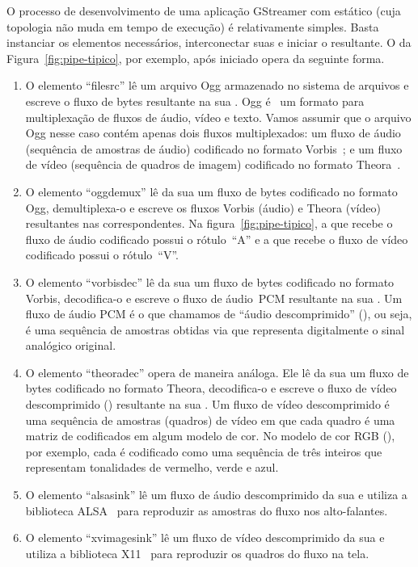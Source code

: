 \documentclass{SBCbookchapter}
\begin{document}
O processo de desenvolvimento de uma aplicação GStreamer com 
estático (cuja topologia não muda em tempo de execução) é relativamente
simples.  Basta instanciar os elementos necessários, interconectar suas
 e iniciar o  resultante.  O  da
Figura~\ref{fig:pipe-tipico}, por exemplo, após iniciado opera da seguinte
forma.
\begin{enumerate}
\item O elemento ``filesrc'' lê um arquivo Ogg armazenado no sistema de
  arquivos e escreve o fluxo de bytes resultante na sua .
  Ogg é~\cite{ogg-rfc-3533} um formato para multiplexação de fluxos de
  áudio, vídeo e texto.  Vamos assumir que o arquivo Ogg nesse caso contém
  apenas dois fluxos multiplexados: um fluxo de áudio (sequência de amostras
  de áudio) codificado no formato Vorbis~\cite{vorbis}; e um fluxo de vídeo
  (sequência de quadros de imagem) codificado no formato
  Theora~\cite{theora}.
\item O elemento ``oggdemux'' lê da sua  um fluxo de bytes
  codificado no formato Ogg, demultiplexa-o e escreve os fluxos Vorbis
  (áudio) e Theora (vídeo) resultantes nas  correspondentes.
  Na figura~\ref{fig:pipe-tipico}, a  que recebe o fluxo
  de áudio codificado possui o rótulo~``A'' e a  que recebe o
  fluxo de vídeo codificado possui o rótulo~``V''.
\item O elemento ``vorbisdec'' lê da sua  um fluxo de bytes
  codificado no formato Vorbis, decodifica-o e escreve o fluxo de áudio~PCM
  resultante na sua .  Um fluxo de áudio PCM é o que chamamos
  de ``áudio descomprimido'' (), ou seja, é uma sequência de
  amostras obtidas via  que representa
  digitalmente o sinal analógico original.
\item O elemento ``theoradec'' opera de maneira análoga.  Ele lê da sua
   um fluxo de bytes codificado no formato Theora, decodifica-o
  e escreve o fluxo de vídeo descomprimido () resultante na sua
  .  Um fluxo de vídeo descomprimido é uma sequência de
  amostras (quadros) de vídeo em que cada quadro é uma matriz de 
  codificados em algum modelo de cor.  No modelo de cor RGB
  (), por exemplo, cada  é codificado como uma
  sequência de três inteiros que representam tonalidades de vermelho, verde
  e azul.
\item O elemento ``alsasink'' lê um fluxo de áudio descomprimido da sua
   e utiliza a biblioteca ALSA~\cite{alsa} para reproduzir as
  amostras do fluxo nos alto-falantes.
\item O elemento ``xvimagesink'' lê um fluxo de vídeo descomprimido da sua
   e utiliza a biblioteca X11~\cite{x11} para reproduzir os
  quadros do fluxo na tela.
\end{enumerate}
\end{document}
